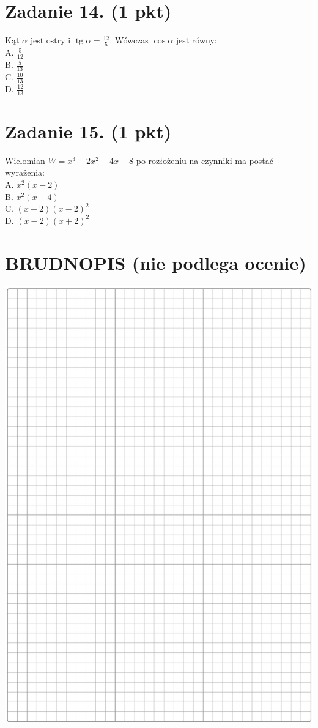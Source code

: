 \documentclass[10pt]{article}
\begin{document}
\section*{Zadanie 14. (1 pkt)}
Kąt \(\alpha\) jest ostry i \(\operatorname{tg} \alpha=\frac{12}{5}\). Wówczas \(\cos \alpha\) jest równy:\\
A. \(\frac{5}{12}\)\\
B. \(\frac{5}{13}\)\\
C. \(\frac{10}{13}\)\\
D. \(\frac{12}{13}\)

\section*{Zadanie 15. (1 pkt)}
Wielomian \(W=x^{3}-2 x^{2}-4 x+8\) po rozłożeniu na czynniki ma postać wyrażenia:\\
A. \(x^{2}(x-2)\)\\
B. \(x^{2}(x-4)\)\\
C. \((x+2)(x-2)^{2}\)\\
D. \((x-2)(x+2)^{2}\)

\section*{BRUDNOPIS (nie podlega ocenie)}
\begin{center}
\includegraphics[max width=\textwidth]{2024_11_21_a38d702bc7be8115942cg-05}
\end{center}
\end{document}
